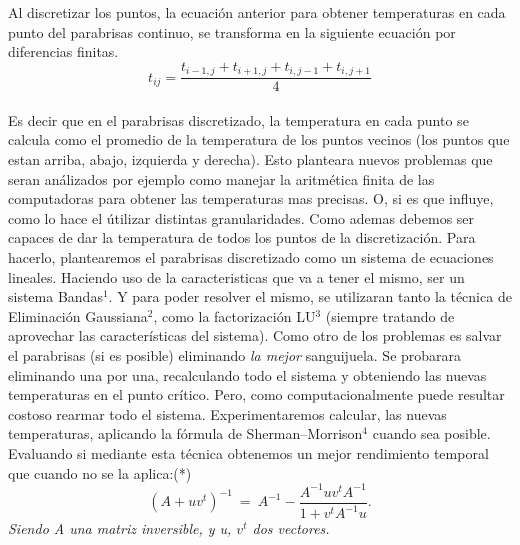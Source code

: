 Al discretizar los puntos, la ecuación anterior para obtener temperaturas en cada punto del parabrisas continuo, se transforma en la siguiente ecuación por diferencias finitas.
\begin{equation}
t_{ij} = \frac{t_{i-1,j} + t_{i+1,j} + t_{i,j-1} + t_{i,j+1}}{4}
\end{equation}\\
Es decir que en el parabrisas discretizado, la temperatura en cada punto se calcula como el promedio de la temperatura de los puntos vecinos (los puntos que estan arriba, abajo, izquierda y derecha).\newline
Esto planteara nuevos problemas que seran análizados por ejemplo como manejar la aritmética finita de las computadoras para obtener las temperaturas mas precisas. O, si es que influye, como lo hace el útilizar distintas granularidades.\newline
Como ademas debemos ser capaces de dar la temperatura de todos los puntos de la discretización. Para hacerlo, plantearemos el parabrisas discretizado como un sistema de ecuaciones lineales. Haciendo uso de la caracteristicas que va a tener el mismo, ser un sistema Bandas$^1$. 
 Y para poder resolver el mismo, se utilizaran tanto la técnica de Eliminación Gaussiana$^2$, como la factorización LU$^3$ (siempre tratando de aprovechar las características del sistema).\newline
Como otro de los problemas es salvar el parabrisas (si es posible) eliminando \textit{la mejor} sanguijuela. Se probarara eliminando una por una, recalculando todo el sistema y  obteniendo las nuevas temperaturas en el punto crítico. Pero, como computacionalmente puede resultar costoso rearmar todo el sistema. Experimentaremos calcular, las nuevas temperaturas, aplicando la fórmula de Sherman–Morrison$^4$ cuando sea posible. Evaluando si mediante esta técnica obtenemos un mejor rendimiento temporal que cuando no se la aplica:(*)
\begin{equation}
	(A+ uv^t)^{-1} \ =\ A^{-1} - \frac{ A^{-1} u v^t A^{-1} }{1+v^t A^{-1}u}.\label{eq:sm}
\end{equation} 
\textit{Siendo A una matriz inversible, y u, $v^t$ dos vectores.}   
   

